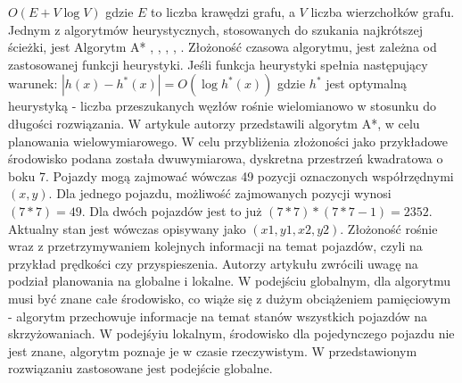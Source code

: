 \newline
\newline
\begin{math}
O(E + V\log V)
\end{math}
\newline
\newline
gdzie \begin{math}E\end{math} to liczba krawędzi grafu, a \begin{math}V\end{math} liczba wierzchołków grafu.
\indent
\newline
\newline
\indent
  Jednym z algorytmów heurystycznych, stosowanych do szukania najkrótszej ścieżki, jest Algorytm A* \cite{munteanmobile}, \cite{oleiwi2014modified}, \cite{wojnicki2015robust}, \cite{elhalawany2013modified}, \cite{dechter1985generalized}. Złożoność czasowa algorytmu, jest zależna od zastosowanej funkcji heurystyki. Jeśli funkcja heurystyki spełnia następujący warunek:
\newline
\newline
\begin{math}
|h(x)-h^{*}(x)|=O(\log h^{*}(x))
\end{math}
\newline
\newline
gdzie \begin{math}h^{*}\end{math} jest optymalną heurystyką - liczba przeszukanych węzłów rośnie wielomianowo w stosunku do długości rozwiązania.
\newline
\indent
W artykule \cite{wojnicki2015robust} autorzy przedstawili algorytm A*, w celu planowania wielowymiarowego. W celu przybliżenia złożoności jako przykładowe środowisko podana została dwuwymiarowa, dyskretna przestrzeń kwadratowa o boku 7. Pojazdy mogą zajmować wówczas 49 pozycji oznaczonych współrzędnymi \begin{math}(x, y)\end{math}. Dla jednego pojazdu, możliwość zajmowanych pozycji wynosi \begin{math}(7 * 7) = 49 \end{math}. Dla dwóch pojazdów jest to już \begin{math}(7 * 7) * (7 * 7 - 1) = 2352 \end{math}. Aktualny stan jest wówczas opisywany jako \begin{math}(x1, y1, x2, y2)\end{math}. Złożoność rośnie wraz z przetrzymywaniem kolejnych informacji na temat pojazdów, czyli na przykład prędkości czy przyspieszenia.
\newline
\indent
Autorzy artykułu \cite{leena2014survey} zwrócili uwagę na podział planowania na globalne i lokalne. W podejściu globalnym, dla algorytmu musi być znane całe środowisko, co wiąże się z dużym obciążeniem pamięciowym - algorytm przechowuje informacje na temat stanów wszystkich pojazdów na skrzyżowaniach. W podejśyiu lokalnym, środowisko dla pojedynczego pojazdu nie jest znane, algorytm poznaje je w czasie rzeczywistym. W przedstawionym rozwiązaniu zastosowane jest podejście globalne.

